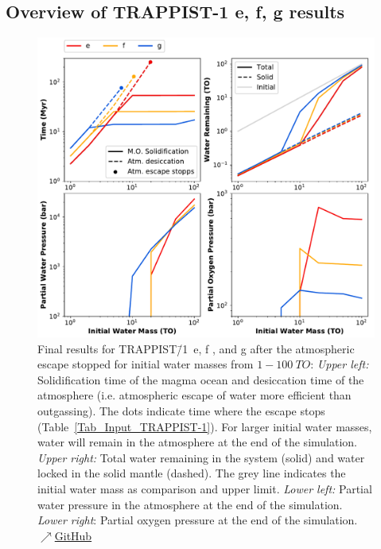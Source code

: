 \documentclass[oneside,twocolumn]{article}
\begin{document}
\subsection{Overview of TRAPPIST-1 e, f, g results}
\begin{figure}[p]
    \centering
    \includegraphics[width=\textwidth]{BarthFig8.pdf}
    \caption{Final results for TRAPPIST\=/1~e, f , and g after the atmospheric escape stopped for initial water masses from $1 - \SI{100}{TO}$: \textit{Upper left:} Solidification time of the magma ocean and desiccation time of the atmosphere (i.e. atmospheric escape of water more efficient than outgassing). The dots indicate time where the escape stops (Table~\ref{Tab_Input_TRAPPIST-1}). For larger initial water masses, water will remain in the atmosphere at the end of the simulation. \textit{Upper right:} Total water remaining in the system (solid) and water locked in the solid mantle (dashed). The grey line indicates the initial water mass as comparison and upper limit. \textit{Lower left:} Partial water pressure in the atmosphere at the end of the simulation. \textit{Lower right}: Partial oxygen pressure at the end of the simulation.
    \href{https://github.com/pbfeu/Trappist1_MagmOc/tree/public/Fig_Trappist1_Summary}{$\nearrow$GitHub}
    }
    \label{TR1_Summary}
\end{figure}
\end{document}
